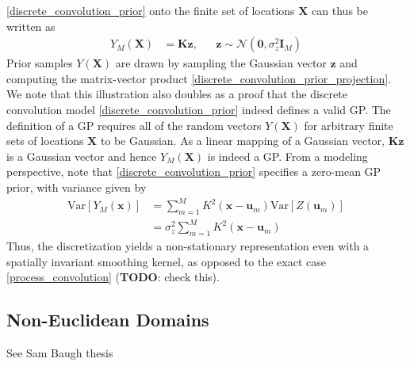 \documentclass[12pt]{article}
\newcommand{\Var}{\mathrm{Var}}
\newcommand{\zeroVec}{\mathbf{0}}
\newcommand{\Gaussian}{\mathcal{N}}
\newcommand{\I}{\mathbf{I}}
\newcommand{\Ker}{K}
\newcommand{\loc}{\mathbf{x}}
\newcommand{\locDum}{\mathbf{u}}
\newcommand{\locMat}{\mathbf{X}}
\newcommand{\rf}{Y}
\newcommand{\numKnot}{M}
\newcommand{\knotIdx}{m}
\newcommand{\kerMat}{\mathbf{K}}
\begin{document}
\ref{discrete_convolution_prior} onto the finite set of locations $\locMat$ can thus be written as 
\begin{align}
\rf_{\numKnot}(\locMat) &= \kerMat \mathbf{z}, &&\mathbf{z} \sim \Gaussian(\zeroVec, \sigma_{z}^2 \I_{\numKnot}) \label{discrete_convolution_prior_projection}
\end{align} 
Prior samples $\rf(\locMat)$ are drawn by sampling the Gaussian vector $\mathbf{z}$ and computing the matrix-vector product \ref{discrete_convolution_prior_projection}. We note that 
this illustration also doubles as a proof that the discrete convolution model \ref{discrete_convolution_prior} indeed defines a valid GP. The definition of a GP requires all of the 
random vectors $\rf(\locMat)$ for arbitrary finite sets of locations $\locMat$ to be Gaussian. As a linear mapping of a Gaussian vector, $\kerMat \mathbf{z}$ is a Gaussian vector and hence 
$\rf_{\numKnot}(\locMat)$ is indeed a GP. From a modeling perspective, note that \ref{discrete_convolution_prior} specifies a zero-mean GP prior, with variance given by 
\begin{align*}
\Var[\rf_{\numKnot}(\loc)] 
&= \sum_{\knotIdx = 1}^{\numKnot} \Ker^2(\loc - \locDum_{\knotIdx}) \Var[Z(\locDum_{\knotIdx})] \\
&= \sigma_z^2 \sum_{\knotIdx = 1}^{\numKnot} \Ker^2(\loc - \locDum_{\knotIdx})
\end{align*}
Thus, the discretization yields a non-stationary representation even with a spatially invariant smoothing kernel, as opposed to the exact case \ref{process_convolution} 
(\textbf{TODO}: check this).




\subsection{Non-Euclidean Domains}
See Sam Baugh thesis
\end{document}
